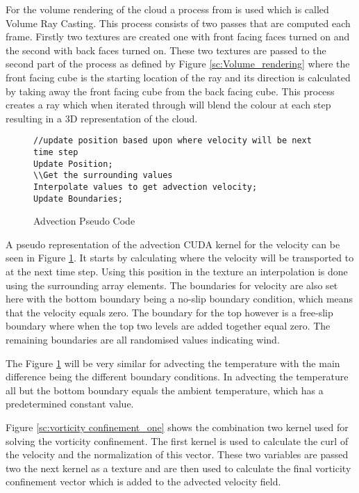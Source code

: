 For the volume rendering of the cloud a process from \citet{KHayward09} is used which is called Volume Ray Casting.
This process consists of two passes that are computed each frame.
Firstly two textures are created one with front facing faces turned on and the second with back faces turned on.
These two textures are passed to the second part of the process as defined by Figure \ref{sc:Volume_rendering} where the front facing cube is the starting location of the ray and its direction is calculated by taking away the front facing cube from the back facing cube.
This process creates a ray which when iterated through will blend the colour at each step resulting in a 3D representation of the cloud.

\begin{figure}[h|]
\centering
\begin{lstlisting}
//update position based upon where velocity will be next time step
Update Position;
\\Get the surrounding values
Interpolate values to get advection velocity;	
Update Boundaries;
\end{lstlisting}
\caption{Advection Pseudo Code}
\label{sc:AdvectionPseudoCode}
\end{figure}

A pseudo representation of the advection CUDA kernel for the velocity can be seen in Figure \ref{sc:AdvectionPseudoCode}.
It starts by calculating where the velocity will be transported to at the next time step.
Using this position in the texture an interpolation is done using the surrounding array elements.
The boundaries for velocity are also set here with the bottom boundary being a no-slip boundary condition, which means that the velocity equals zero.
The boundary for the top however is a free-slip boundary where when the top two levels are added together equal zero.
The remaining boundaries are all randomised values indicating wind. 

The Figure \ref{sc:AdvectionPseudoCode} will be very similar for advecting the temperature with the main difference being the different boundary conditions.
In advecting the temperature all but the bottom boundary equals the ambient temperature, which has a predetermined constant value.

Figure \ref{sc:vorticity confinement_one} shows the combination two kernel used for solving the vorticity confinement.
The first kernel is used to calculate the curl of the velocity and the normalization of this vector.
These two variables are passed two the next kernel as a texture and are then used to calculate the final vorticity confinement vector which is added to the advected velocity field.


